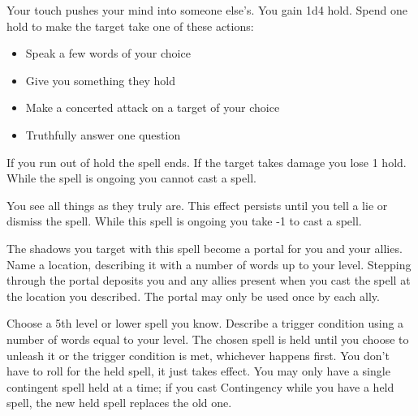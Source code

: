 
Your touch pushes your mind into someone else's. You gain 1d4 hold. Spend one hold to make the target take one of these actions:
\begin{itemize}
\item Speak a few words of your choice
\item Give you something they hold
\item Make a concerted attack on a target of your choice
\item Truthfully answer one question

\end{itemize}

If you run out of hold the spell ends. If the target takes damage you lose 1 hold. While the spell is ongoing you cannot cast a spell.



You see all things as they truly are. This effect persists until you tell a lie or dismiss the spell. While this spell is ongoing you take -1 to cast a spell.

\newpage
{}


The shadows you target with this spell become a portal for you and your allies. Name a location, describing it with a number of words up to your level. Stepping through the portal deposits you and any allies present when you cast the spell at the location you described. The portal may only be used once by each ally.



Choose a 5th level or lower spell you know. Describe a trigger condition using a number of words equal to your level. The chosen spell is held until you choose to unleash it or the trigger condition is met, whichever happens first. You don't have to roll for the held spell, it just takes effect. You may only have a single contingent spell held at a time; if you cast Contingency while you have a held spell, the new held spell replaces the old one.




